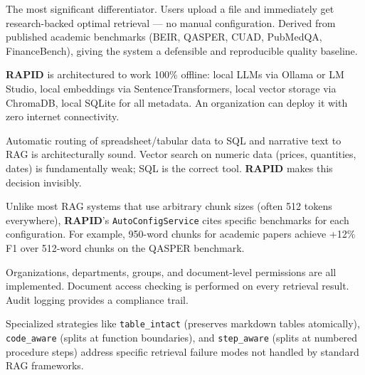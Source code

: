 \documentclass[12pt, a4paper, oneside]{report}
\newcommand{\kw}[1]{\texttt{\small #1}}
\newcommand{\rapidsys}{\textbf{\color{rapidblue}RAPID}}
\begin{document}
\begin{probox}
The most significant differentiator. Users upload a file and immediately get research-backed
optimal retrieval — no manual configuration. Derived from published academic benchmarks
(BEIR, QASPER, CUAD, PubMedQA, FinanceBench), giving the system a defensible and
reproducible quality baseline.
\end{probox}

\begin{probox}
\rapidsys{} is architectured to work 100\% offline: local LLMs via Ollama or LM Studio,
local embeddings via SentenceTransformers, local vector storage via ChromaDB, local SQLite
for all metadata. An organization can deploy it with zero internet connectivity.
\end{probox}

\begin{probox}
Automatic routing of spreadsheet/tabular data to SQL and narrative text to RAG is
architecturally sound. Vector search on numeric data (prices, quantities, dates) is
fundamentally weak; SQL is the correct tool. \rapidsys{} makes this decision invisibly.
\end{probox}

\begin{probox}
Unlike most RAG systems that use arbitrary chunk sizes (often 512 tokens everywhere),
\rapidsys{}'s \kw{AutoConfigService} cites specific benchmarks for each configuration.
For example, 950-word chunks for academic papers achieve +12\% F1 over 512-word chunks
on the QASPER benchmark.
\end{probox}

\begin{probox}
Organizations, departments, groups, and document-level permissions are all implemented.
Document access checking is performed on every retrieval result. Audit logging provides
a compliance trail.
\end{probox}

\begin{probox}
Specialized strategies like \kw{table\_intact} (preserves markdown tables atomically),
\kw{code\_aware} (splits at function boundaries), and \kw{step\_aware} (splits at numbered
procedure steps) address specific retrieval failure modes not handled by standard RAG
frameworks.
\end{probox}
\end{document}
